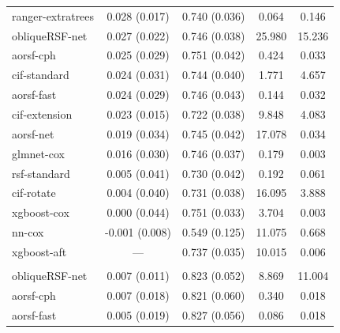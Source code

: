 \documentclass[twoside,11pt]{article}\usepackage[]{graphicx}\usepackage[]{xcolor}
\newenvironment{knitrout}{}{} %
\begin{document}
\begin{knitrout}
\begin{longtable}[t]{lcccc}
\hspace{1em}ranger-extratrees & 0.028 (0.017) & 0.740 (0.036) & 0.064 & 0.146\\
\hspace{1em}obliqueRSF-net & 0.027 (0.022) & 0.746 (0.038) & 25.980 & 15.236\\
\hspace{1em}aorsf-cph & 0.025 (0.029) & 0.751 (0.042) & 0.424 & 0.033\\
\hspace{1em}cif-standard & 0.024 (0.031) & 0.744 (0.040) & 1.771 & 4.657\\
\hspace{1em}aorsf-fast & 0.024 (0.029) & 0.746 (0.043) & 0.144 & 0.032\\
\hspace{1em}cif-extension & 0.023 (0.015) & 0.722 (0.038) & 9.848 & 4.083\\
\hspace{1em}aorsf-net & 0.019 (0.034) & 0.745 (0.042) & 17.078 & 0.034\\
\hspace{1em}glmnet-cox & 0.016 (0.030) & 0.746 (0.037) & 0.179 & 0.003\\
\hspace{1em}rsf-standard & 0.005 (0.041) & 0.730 (0.042) & 0.192 & 0.061\\
\hspace{1em}cif-rotate & 0.004 (0.040) & 0.731 (0.038) & 16.095 & 3.888\\
\hspace{1em}xgboost-cox & 0.000 (0.044) & 0.751 (0.033) & 3.704 & 0.003\\
\hspace{1em}nn-cox & -0.001 (0.008) & 0.549 (0.125) & 11.075 & 0.668\\
\hspace{1em}xgboost-aft & --- & 0.737 (0.035) & 10.015 & 0.006\\
\addlinespace[0.3em]
\multicolumn{5}{l}{\textit{\textbf{ACTG 320; death, n = 1151, p = 12}}}\\
\hline
\hspace{1em}obliqueRSF-net & 0.007 (0.011) & 0.823 (0.052) & 8.869 & 11.004\\
\hspace{1em}aorsf-cph & 0.007 (0.018) & 0.821 (0.060) & 0.340 & 0.018\\
\hspace{1em}aorsf-fast & 0.005 (0.019) & 0.827 (0.056) & 0.086 & 0.018\\

\end{longtable}
\end{knitrout}
\end{document}
